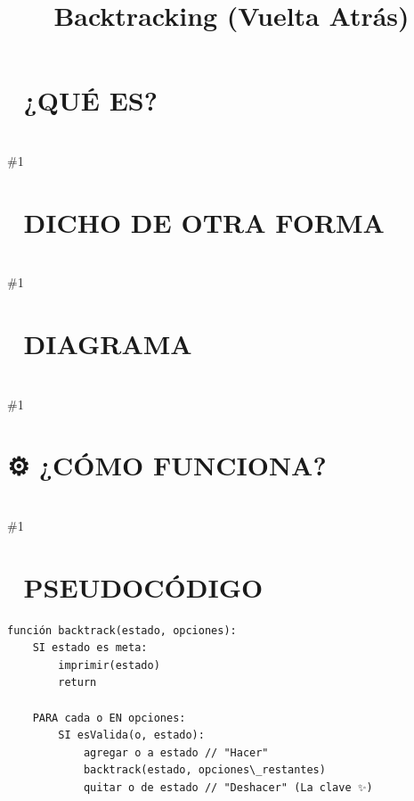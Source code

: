 \documentclass{article}
\newcommand{\quees}[1]{\section*{🤔 ¿QUÉ ES?}\hrulefill \\ \#1}
\newcommand{\dichodeotraforma}[1]{\section*{💬 DICHO DE OTRA FORMA}\hrulefill \\ \#1}
\newcommand{\diagrama}[1]{\section*{🎨 DIAGRAMA}\hrulefill \\ \#1}
\newcommand{\comofunciona}[1]{\section*{⚙️ ¿CÓMO FUNCIONA?}\hrulefill \\ \#1}
\begin{document}
\title{Backtracking (Vuelta Atrás)}
\date{}
\maketitle
\quees{Resolver un laberinto 🌀 con un lápiz. 

Sigues un camino con la punta del lápiz hasta que llegas a un 
callejón sin salida. En lugar de rendirte, borras lo que hiciste 
(vuelta atrás) hasta la última bifurcación y pruebas el otro camino 
que dejaste pendiente.

Backtracking es probar TODAS las posibilidades una por una, pero 
con la inteligencia de "deshacer" tus pasos cuando te das cuenta 
de que una ruta no lleva a la solución. Es una búsqueda exhaustiva 
pero controlada.}
\dichodeotraforma{Backtracking es una técnica algorítmica para resolver problemas de 
forma recursiva, intentando construir una solución incrementalmente. 

Se basa en la exploración de un "Árbol de Decisiones". Si en algún 
punto la solución parcial no cumple con las restricciones del problema 
(se vuelve inválida), el algoritmo descarta esa rama ("pruning") y 
regresa al estado anterior para intentar otra opción.

Es la base para resolver problemas de combinatoria, permutaciones y 
juegos como el Sudoku o el Ajedrez.}
\diagrama{\begin{verbatim}
[root]
              /      \
        Elegir 1?   NO elegir 1?
         /    \        /      \
     Elegir 2? NO?   Elegir 2? NO?
       |        |       |        |
     [1,2]     [1]     [2]      []

¡Cada nodo es una decisión! Backtracking recorre este árbol usando DFS.
\end{verbatim}}
\comofunciona{Casi todos los problemas de Backtracking siguen este patrón:

1. Caso Base: ¿Ya terminamos de construir la solución?
   - SÍ: Guárdala o imprímela. Regresa.
2. Opciones: Para cada opción disponible en este nivel:
   - ¿Es válida la opción? (Restricciones).
   - SÍ: 
     a. Hacer Elección: Modifica el estado actual.
     b. Recursión: Llama a la función para el siguiente nivel.
     c. Deshacer Elección (BACKTRACK): Regresa el estado como estaba.}
\section*{📝 PSEUDOCÓDIGO}
\hrulefill
\begin{verbatim}
función backtrack(estado, opciones):
    SI estado es meta:
        imprimir(estado)
        return

    PARA cada o EN opciones:
        SI esValida(o, estado):
            agregar o a estado // "Hacer"
            backtrack(estado, opciones\_restantes)
            quitar o de estado // "Deshacer" (La clave ✨)
\end{verbatim}
\end{document}
